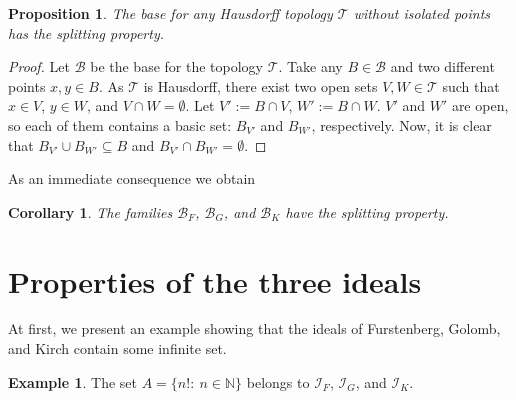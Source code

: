 \documentclass{amsart}
\newtheorem{prop}[thm]{Proposition}
\newtheorem{cor}[thm]{Corollary}
\theoremstyle{definition}
\newtheorem{ex}[thm]{Example}
\newcommand{\N}{{\mathbb N}}
\newcommand{\I}{\mathcal I}
\newcommand{\T}{\mathcal{T}}
\newcommand{\B}{\mathcal{B}}
\begin{document}
\begin{prop} \label{remH}
The base for any Hausdorff topology $\T$ without isolated points has the splitting property.
\end{prop}

\begin{proof}
Let $\B$ be the base for the topology $\T$. Take any $B\in\B$ and two different points $x,y\in B$. As $\T$ is Hausdorff, there exist two open sets $V,W\in\T$ such that $x\in V$, $y\in W$, and $V\cap W = \emptyset$. Let $V':=B\cap V$, $W':=B\cap W$. $V'$ and $W'$ are open, so each of them contains a basic set: $B_{V'}$ and $B_{W'}$, respectively. Now, it is clear that $B_{V'}\cup B_{W'}\subseteq B$ and $B_{V'}\cap B_{W'}=\emptyset$.
\end{proof}

As an immediate consequence we obtain

\begin{cor}
The families $\B_F$, $\B_G$, and $\B_K$ have the splitting property.
\end{cor}

\section{Properties of the three ideals}\label{examples}

At first, we present an example showing that the ideals of Furstenberg, Golomb, and Kirch contain some infinite set.

\begin{ex} 
The set $A = \{n! :\ n\in\N\}$ belongs to $\I_F$, $\I_G$, and $\I_K$.
\end{ex}
\end{document}
